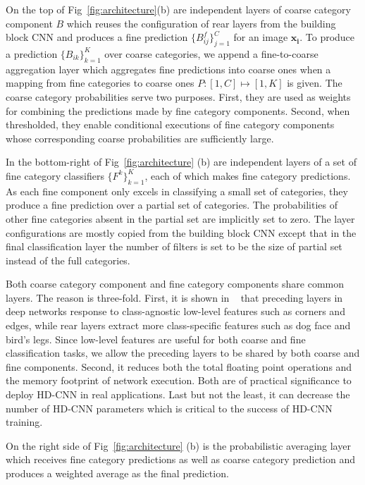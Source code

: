 \documentclass[10pt,twocolumn,letterpaper]{article}
\begin{document}
On the top of Fig~\ref{fig:architecture}(b) are independent layers of coarse category component $B$ which reuses the configuration of rear layers from the building block CNN and produces a fine prediction $\{B^{f}_{ij}\}_{j=1}^{C}$ for an image $\mathbf{x_i}$. To produce a prediction $\{B_{ik}\}_{k=1}^{K}$ over coarse categories, we append a fine-to-coarse aggregation layer which aggregates fine predictions into coarse ones when a mapping from fine categories to coarse ones $P: [1,C] \mapsto [1,K]$ is given. The coarse category probabilities serve two purposes. First, they are used as weights for combining the predictions made by fine category components. Second, when thresholded, they enable conditional executions of fine category components whose corresponding coarse probabilities are sufficiently large.

In the bottom-right of Fig~\ref{fig:architecture} (b) are independent layers of a set of fine category classifiers  $\{F^{k}\}_{k=1}^{K} $, each of which makes fine category predictions. As each fine component only excels in classifying a small set of categories, they produce a fine prediction over a partial set of categories. The probabilities of other fine categories absent in the partial set are implicitly set to zero. The layer configurations are mostly copied from the building block CNN except that in the final classification layer the number of filters is set to be the size of partial set instead of the full categories.

Both coarse category component and fine category components share common layers. The reason is three-fold. First, it is shown in ~\cite{zeiler2014visualizing} that preceding layers in deep networks response to class-agnostic low-level features such as corners and edges, while rear layers extract more class-specific features such as dog face and bird's legs. Since low-level features are useful for both coarse and fine classification tasks, we allow the preceding layers to be shared by both coarse and fine components. Second, it reduces both the total floating point operations and the memory footprint of network execution. Both are of practical significance to deploy HD-CNN in real applications. Last but not the least, it can decrease the number of HD-CNN parameters which is critical to the success of HD-CNN training.



On the right side of Fig~\ref{fig:architecture} (b) is the probabilistic averaging layer which receives fine category predictions as well as coarse category prediction and produces a weighted average as the final prediction.
\end{document}
